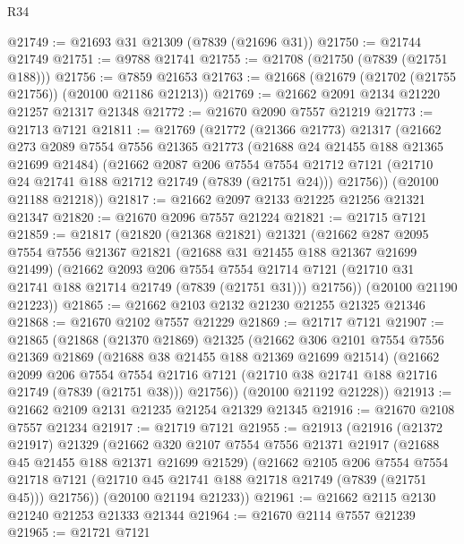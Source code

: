 \begin{lexlean}{R34}
\begin{coremodule}
@21749 := @21693 @31 @21309 (@7839 (@21696 @31))
@21750 := @21744 @21749
@21751 := @9788 @21741
@21755 := @21708 (@21750 (@7839 (@21751 @188)))
@21756 := @7859 @21653
@21763 := @21668 (@21679 (@21702 (@21755 @21756)) (@20100 @21186 @21213))
@21769 := @21662 @2091 @2134 @21220 @21257 @21317 @21348
@21772 := @21670 @2090 @7557 @21219
@21773 := @21713 @7121
@21811 := @21769
    (@21772
      (@21366 @21773)
      @21317
      (@21662
        @273
        @2089
        @7554
        @7556
        @21365
        @21773
        (@21688 @24 @21455 @188 @21365 @21699 @21484)
        (@21662
          @2087
          @206
          @7554
          @7554
          @21712
          @7121
          (@21710 @24 @21741 @188 @21712 @21749 (@7839 (@21751 @24)))
          @21756))
      (@20100 @21188 @21218))
@21817 := @21662 @2097 @2133 @21225 @21256 @21321 @21347
@21820 := @21670 @2096 @7557 @21224
@21821 := @21715 @7121
@21859 := @21817
    (@21820
      (@21368 @21821)
      @21321
      (@21662
        @287
        @2095
        @7554
        @7556
        @21367
        @21821
        (@21688 @31 @21455 @188 @21367 @21699 @21499)
        (@21662
          @2093
          @206
          @7554
          @7554
          @21714
          @7121
          (@21710 @31 @21741 @188 @21714 @21749 (@7839 (@21751 @31)))
          @21756))
      (@20100 @21190 @21223))
@21865 := @21662 @2103 @2132 @21230 @21255 @21325 @21346
@21868 := @21670 @2102 @7557 @21229
@21869 := @21717 @7121
@21907 := @21865
    (@21868
      (@21370 @21869)
      @21325
      (@21662
        @306
        @2101
        @7554
        @7556
        @21369
        @21869
        (@21688 @38 @21455 @188 @21369 @21699 @21514)
        (@21662
          @2099
          @206
          @7554
          @7554
          @21716
          @7121
          (@21710 @38 @21741 @188 @21716 @21749 (@7839 (@21751 @38)))
          @21756))
      (@20100 @21192 @21228))
@21913 := @21662 @2109 @2131 @21235 @21254 @21329 @21345
@21916 := @21670 @2108 @7557 @21234
@21917 := @21719 @7121
@21955 := @21913
    (@21916
      (@21372 @21917)
      @21329
      (@21662
        @320
        @2107
        @7554
        @7556
        @21371
        @21917
        (@21688 @45 @21455 @188 @21371 @21699 @21529)
        (@21662
          @2105
          @206
          @7554
          @7554
          @21718
          @7121
          (@21710 @45 @21741 @188 @21718 @21749 (@7839 (@21751 @45)))
          @21756))
      (@20100 @21194 @21233))
@21961 := @21662 @2115 @2130 @21240 @21253 @21333 @21344
@21964 := @21670 @2114 @7557 @21239
@21965 := @21721 @7121

\end{coremodule}
\end{lexlean}
